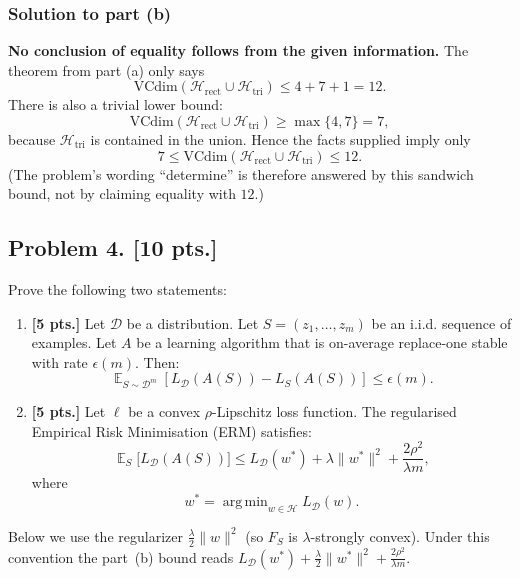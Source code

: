 \documentclass[11pt,a4paper]{article}
\DeclareMathOperator*{\argmin}{arg\,min}
\DeclareMathOperator{\E}{\mathbb{E}}
\theoremstyle{definition}
\begin{document}
\subsubsection{Solution to part (b)}

\textbf{No conclusion of equality follows from the given information.} The theorem from part (a) only says
\[
\text{VCdim} (\mathcal{H}_{\text{rect}} \cup \mathcal{H}_{\text{tri}}) \leq 4 + 7 + 1 = 12.
\]
There is also a trivial lower bound:
\[
\text{VCdim} (\mathcal{H}_{\text{rect}} \cup \mathcal{H}_{\text{tri}}) \geq \max\{4, 7\} = 7,
\]
because \(\mathcal{H}_{\text{tri}}\) is contained in the union. Hence the facts supplied imply only
\[
7 \leq \text{VCdim} (\mathcal{H}_{\text{rect}} \cup \mathcal{H}_{\text{tri}}) \leq 12.
\]
(The problem's wording ``determine'' is therefore answered by this sandwich bound, not by claiming equality with \(12\).)




\subsection{Problem 4. [10 pts.]}
Prove the following two statements:
\begin{enumerate}[label=(\alph*)]
    \item \textbf{[5 pts.]} Let $\mathcal{D}$ be a distribution. Let $S = (z_1, \dots, z_m)$ be an i.i.d. sequence of examples. Let $A$ be a learning algorithm that is on-average replace-one stable with rate $\epsilon(m)$. Then:
    \[
    \E_{S \sim \mathcal{D}^m} \left[ L_{\mathcal{D}}(A(S)) - L_S(A(S)) \right] \le \epsilon(m).
    \]
    \item \textbf{[5 pts.]} Let $\ell$ be a convex $\rho$-Lipschitz loss function. The regularised Empirical Risk Minimisation (ERM) satisfies:
    \[
    \E_S \bigl[ L_{\mathcal{D}}(A(S)) \bigr] \le L_{\mathcal{D}}(w^*) + \lambda \|w^*\|^2 + \frac{2\rho^2}{\lambda m},
    \]
    where
    \[
    w^* = \argmin_{w \in \mathcal{H}} L_{\mathcal{D}}(w).
    \]
\end{enumerate}

\begin{note}
Below we use the regularizer \(\tfrac{\lambda}{2}\|w\|^2\) (so \(F_S\) is \(\lambda\)-strongly convex). Under this convention the part~(b) bound reads
\(L_{\mathcal{D}}(w^*)+\tfrac{\lambda}{2}\|w^*\|^2+\tfrac{2\rho^2}{\lambda m}\).
\end{note}
\end{document}
